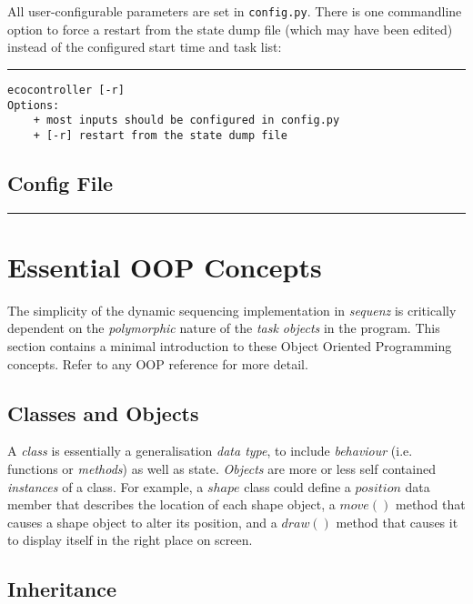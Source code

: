 \documentclass[11pt,a4paper]{article}
\begin{document}
All user-configurable parameters are set in \verb#config.py#. There is
one commandline option to force a restart from the state dump file
(which may have been edited) instead of the configured start time and
task list:

\lstset{language=sh}

{\small

\noindent
\rule{5cm}{.2mm}
\begin{lstlisting}
ecocontroller [-r]
Options:
    + most inputs should be configured in config.py
    + [-r] restart from the state dump file
\end{lstlisting}
}

\lstset{language=Python}

\subsection{Config File}

{\small
\noindent
\rule{5cm}{.2mm}

}

\appendix

\section{Essential OOP Concepts}

The simplicity of the dynamic sequencing implementation in {\em sequenz}
is critically dependent on the {\em polymorphic} nature of the {\em task
objects} in the program.  This section contains a minimal introduction
to these Object Oriented Programming concepts.  Refer to any OOP
reference for more detail.

\subsection{Classes and Objects}

A {\em class} is essentially a generalisation {\em data type}, to
include {\em behaviour} (i.e. functions or {\em methods}) as well as
state.  {\em Objects} are more or less self contained {\em instances} of
a class. For example, a $shape$ class could define a $position$ data
member that describes the location of each shape object, a $move()$
method that causes a shape object to alter its position, and a $draw()$
method that causes it to display itself in the right place on screen.

\subsection{Inheritance}
\end{document}
